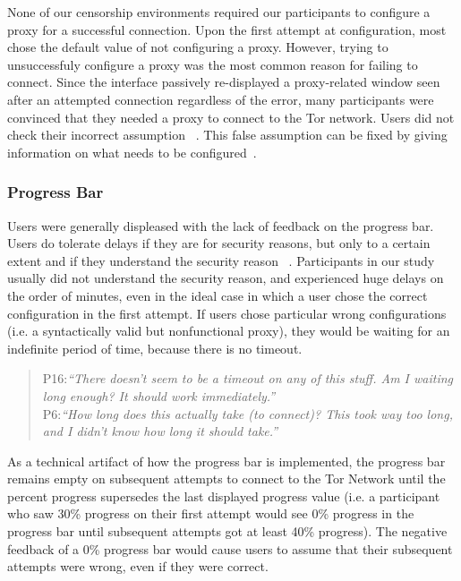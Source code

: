 \documentclass[USenglish,oneside,twocolumn]{article}
\begin{document}
None of our censorship environments required our participants to configure a proxy for a successful connection. Upon the first attempt at configuration, most chose the default value of not configuring a proxy. However, trying to unsuccessfuly configure a proxy was the most common reason for failing to connect. Since the interface passively re-displayed a proxy-related window seen after an attempted connection regardless of the error, many participants were convinced that they needed a proxy to connect to the Tor network. Users did not check their incorrect assumption ~\cite{wason1960failure}. This false assumption can be fixed by giving information on what needs to be configured~\cite{reeder2005user}. \\

\subsubsection{Progress Bar} 
Users were generally displeased with the lack of feedback on the progress bar. Users do tolerate delays if they are for security reasons, but only to a certain extent and if they understand the security reason ~\cite{egelmanplease}. Participants in our study usually did not understand the security reason, and experienced huge delays on the order of minutes, even in the ideal case in which a user chose the correct configuration in the first attempt. If users chose particular wrong configurations (i.e. a syntactically valid but nonfunctional proxy), they would be waiting for an indefinite period of time, because there is no timeout. 

\begin{quotation}
\noindent P16:\textit{``There doesn't seem to be a timeout on any of this stuff. Am I waiting long enough? It should work immediately.''}\\

\noindent P6:\textit{``How long does this actually take (to connect)? This took way too long, and I didn't know how long it should take.''}
\end{quotation}

As a technical artifact of how the progress bar is implemented, the progress bar remains empty on subsequent attempts to connect to the Tor Network until the percent progress supersedes the last displayed progress value (i.e. a participant who saw 30\% progress on their first attempt would see 0\% progress in the progress bar until subsequent attempts got at least 40\% progress). The negative feedback of a 0\% progress bar would cause users to assume that their subsequent attempts were wrong, even if they were correct. 
\end{document}
